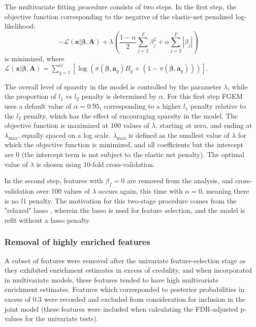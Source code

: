 The multivariate fitting procedure consists of two steps.  In the first step, the objective function corresponding to the negative of the elastic-net penalized log-likelihood:
$$ -\mathcal{L}(\textbf{x}|\boldsymbol{\beta},\textbf{A}) + \lambda\left( \frac{1-\alpha}{2} \sum_{j=2}^F\beta_j^2 + \alpha \sum_{j=2}^F|\beta_j| \right) $$
is minimized, where \(\mathcal{L}(\textbf{x}|\boldsymbol{\beta},\textbf{A}) = \sum_{g=1}^{G}[\log\left(\pi(\boldsymbol{\beta},\textbf{a}_g)B_g+(1-\pi(\boldsymbol{\beta},\textbf{a}_g))\right)]\).
 

The overall level of sparsity in the model is controlled by the parameter \(\lambda\), while the proportion of \(l_1\) vs \(l_2\) penalty is determined by \(\alpha\).  For this first step FGEM uses a default value of $\alpha=0.95$, corresponding to a higher $l_{\text{1}}$ penalty relative to the $l_{\text{2}}$ penalty, which has the effect of encouraging sparsity in the model. The objective function is maximized at 100 values of \(\lambda\), starting at zero, and ending at \(\lambda_{\text{max}}\), equally spaced on a log scale.  \(\lambda_{\text{max}}\) is defined as the smallest value of \(\lambda\) for which the objective function is minimized, and all coefficients but the intercept are 0 (the intercept term is not subject to the elastic net penalty). The optimal value of \(\lambda\) is chosen using 10-fold cross-validation.  

In the second step, features with \(\beta_f=0\) are removed from the analysis, and cross-validation over 100 values of \(\lambda\) occurs again, this time with \(\alpha = 0\), meaning there is no \(l1\) penalty.  The motivation for this two-stage
procedure comes from the "relaxed" lasso \cite{hastie17_exten_compar_best_subset_selec}, wherein the lasso is used for feature selection, and the model is refit without a lasso penalty.  

\subsubsection{Removal of highly enriched features}\label{sec:org02cff25}

    A subset of features were removed after the univariate feature-selection stage as they exhibited enrichment estimates in excess of credulity, and when incorporated in multivariate models, these features tended to have high multivariate enrichment estimates. Features which corresponded to posterior probabilities in excess of 0.3 were recorded and excluded from consideration for inclusion in the joint model (these features were included when calculating the FDR-adjusted p-values for the univariate tests).  

